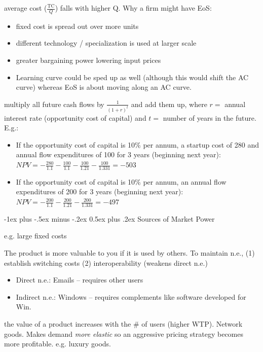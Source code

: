 \documentclass[10pt,landscape]{article}
\makeatletter
\renewcommand{\subsection}{\@startsection{subsection}{2}{0mm}%
                                {-1ex plus -.5ex minus -.2ex}%
                                {0.5ex plus .2ex}%
                                {\normalfont\normalsize\bfseries}}
\newcommand{\Blue}[1]{\noindent{\textbf{\textcolor{Blue}{#1 -}}}}
\newcommand{\Red}[1]{\noindent{\textbf{\textcolor{BrickRed}{#1 -}}}}
\newcommand{\Green}[1]{\noindent{\textbf{\textcolor{PineGreen}{#1 -}}}}
\makeatother
\begin{document}
\begin{multicols}{4}
\Red{Economies of Scale} average cost ($\frac{\text{TC}}{Q}$) falls with higher Q.
Why a firm might have EoS:
\begin{itemize}
    \item fixed cost is spread out over more units
    \item different technology / specialization is used at larger scale
    \item greater bargaining power lowering input prices
    \item Learning curve could be sped up as well (although this would shift the AC curve) whereas EoS is about moving
        along an AC curve.
\end{itemize}

\Green{Net Present Value (NPV)} multiply all future cash flows by $\frac{1}{(1+r)^t}$ and add them up, where $r =$
annual interest rate (opportunity cost of capital) and $t =$ number of years in the future. E.g.:
\begin{itemize}
    \item If the opportunity cost of capital is 10\% per annum, a startup cost of 280 and annual flow expenditures of
        100 for 3 years (beginning next year):
        $NPV = -\frac{280}{1.1} - \frac{100}{1.1} - \frac{100}{1.21} - \frac{100}{1.331} = -503$
    \item If the opportunity cost of capital is 10\% per annum, an annual flow expenditures of 200 for 3 years
        (beginning next year):
        $NPV = - \frac{200}{1.1} - \frac{200}{1.21} - \frac{200}{1.331} = -497$
\end{itemize}

\subsection{Sources of Market Power}

\Red{Barriers to entry} e.g. large fixed costs

\Red{Network Externality} The product is more valuable to you if it is used by others. To maintain n.e., (1) establish
switching costs (2) interoperability (weakens direct n.e.)
\begin{itemize}
    \item Direct n.e.: Emails -- requires other users
    \item Indirect n.e.: Windows -- requires complements like software developed for Win.
\end{itemize}
\Blue{Positive N.E.} the value of a product increases with the \# of users (higher WTP). Network goods. Makes demand \textit{more
elastic} so an aggressive pricing strategy becomes more profitable.
\Blue{Negative N.E.} e.g. luxury goods.


\end{multicols}
\end{document}
